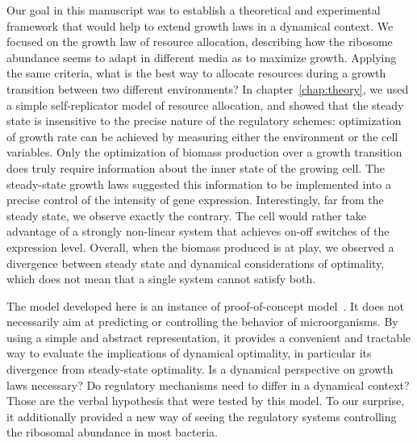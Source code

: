 Our goal in this manuscript was to establish a theoretical and experimental framework that would help to extend growth laws in a dynamical context.
We focused on the growth law of resource allocation, describing how the ribosome abundance seems to adapt in different media as to maximize growth.
Applying the same criteria, what is the best way to allocate resources during a growth transition between two different environments?
In chapter~\ref{chap:theory}, we used a simple self-replicator model of resource allocation, and showed that the steady state is insensitive to the precise nature of the regulatory schemes: optimization of growth rate can be achieved by measuring either the environment or the cell variables.
Only the optimization of biomass production over a growth transition does truly require information about the inner state of the growing cell.
The steady-state growth laws suggested this information to be implemented into a precise control of the intensity of gene expression.
Interestingly, far from the steady state, we observe exactly the contrary.
The cell would rather take advantage of a strongly non-linear system that achieves on-off switches of the expression level.
Overall, when the biomass produced is at play, we observed a divergence between steady state and dynamical considerations of optimality, which does not mean that a single system cannot satisfy both.

The model developed here is an instance of proof-of-concept model~\cite{servedio_not_2014}.
It does not necessarily aim at predicting or controlling the behavior of microorganisms.
By using a simple and abstract representation, it provides a convenient and tractable way to evaluate the implications of dynamical optimality, in particular its divergence from steady-state optimality.
Is a dynamical perspective on growth laws necessary?
Do regulatory mechanisms need to differ in a dynamical context?
Those are the verbal hypothesis that were tested by this model.
To our surprise, it additionally provided a new way of seeing the regulatory systems controlling the ribosomal abundance in most bacteria.

